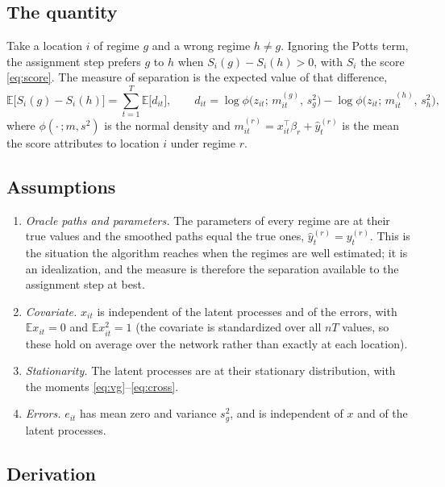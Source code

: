 \documentclass[11pt]{article}
\newcommand{\E}{\mathbb{E}}
\begin{document}
\subsection{The quantity}

Take a location $i$ of regime $g$ and a wrong regime $h \neq g$. Ignoring the Potts term, the assignment step prefers $g$ to $h$ when $S_i(g) - S_i(h) > 0$, with $S_i$ the score \eqref{eq:score}. The measure of separation is the expected value of that difference,
\begin{equation}\label{eq:gap}
  \E\bigl[S_i(g) - S_i(h)\bigr] = \sum_{t=1}^T \E\bigl[d_{it}\bigr], \qquad
  d_{it} = \log \phi\bigl(z_{it};\, m^{(g)}_{it},\, s^2_g\bigr) - \log \phi\bigl(z_{it};\, m^{(h)}_{it},\, s^2_h\bigr),
\end{equation}
where $\phi(\cdot\,; m, s^2)$ is the normal density and $m^{(r)}_{it} = x_{it}^\top\beta_r + \hat y^{(r)}_t$ is the mean the score attributes to location $i$ under regime $r$.

\subsection{Assumptions}

\begin{enumerate}[label=(A\arabic*), leftmargin=2.5em]
  \item \emph{Oracle paths and parameters.} The parameters of every regime are at their true values and the smoothed paths equal the true ones, $\hat y^{(r)}_t = y^{(r)}_t$. This is the situation the algorithm reaches when the regimes are well estimated; it is an idealization, and the measure is therefore the separation available to the assignment step at best.
  \item \emph{Covariate.} $x_{it}$ is independent of the latent processes and of the errors, with $\E x_{it} = 0$ and $\E x_{it}^2 = 1$ (the covariate is standardized over all $nT$ values, so these hold on average over the network rather than exactly at each location).
  \item \emph{Stationarity.} The latent processes are at their stationary distribution, with the moments \eqref{eq:vg}--\eqref{eq:cross}.
  \item \emph{Errors.} $e_{it}$ has mean zero and variance $s^2_g$, and is independent of $x$ and of the latent processes.
\end{enumerate}

\subsection{Derivation}
\end{document}
